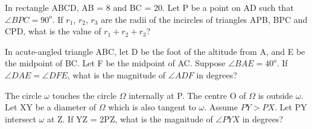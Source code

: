 \item In rectangle ABCD, AB = 8 and BC = 20. Let P be a point on AD such that $\angle BPC = 90^{o}$. If $r_1$, $r_2$, $r_3$ are the radii of the incircles of triangles APB, BPC and CPD, what is the value of $r_1 + r_2 + r_3$?

\item In acute-angled triangle ABC, let D be the foot of the altitude from A, and E be the midpoint of BC. Let F be the midpoint of AC. Suppose $\angle BAE = 40^{o}$. If $\angle DAE = \angle DFE$, what is the magnitude of $\angle ADF$ in degrees?

\item The circle $\omega$ touches the circle $\Omega$ internally at P. The centre O of $\Omega$ is outside $\omega$. Let XY be a diameter of $\Omega$ which is also tangent to $\omega$. Assume $PY > PX$. Let PY intersect $\omega$ at Z. If YZ = 2PZ, what is the magnitude of $\angle PYX$ in degrees?

